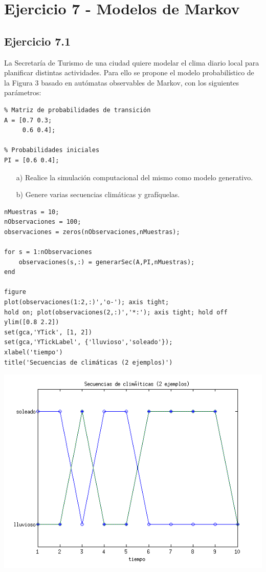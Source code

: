 \documentclass[11pt,a4paper,final]{article}
\begin{document}
\clearpage






\section{Ejercicio 7 - Modelos de Markov}

\subsection{Ejercicio 7.1}


La Secretaría de Turismo de una ciudad quiere modelar el clima diario local para planificar distintas actividades. Para ello se propone el modelo probabilístico de la Figura 3 basado en autómatas observables de Markov, con los siguientes parámetros:

\begin{verbatim}
% Matriz de probabilidades de transición
A = [0.7 0.3;
     0.6 0.4];

% Probabilidades iniciales
PI = [0.6 0.4];
\end{verbatim}
\begin{itemize}
   \item[a)] Realice la simulación computacional del mismo como modelo generativo.
   \item[b)] Genere varias secuencias climáticas y grafíquelas.
\end{itemize}
\begin{verbatim}
nMuestras = 10;
nObservaciones = 100;
observaciones = zeros(nObservaciones,nMuestras);

for s = 1:nObservaciones
    observaciones(s,:) = generarSec(A,PI,nMuestras);
end

figure
plot(observaciones(1:2,:)','o-'); axis tight;
hold on; plot(observaciones(2,:)','*:'); axis tight; hold off
ylim([0.8 2.2])
set(gca,'YTick', [1, 2])
set(gca,'YTickLabel', {'lluvioso','soleado'});
xlabel('tiempo')
title('Secuencias de climáticas (2 ejemplos)')
\end{verbatim}

\includegraphics [width=\textwidth]{Ejercicio7_01.png}
\end{document}
